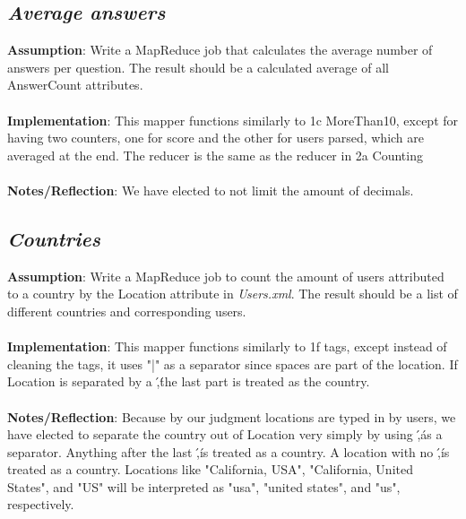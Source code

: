 \documentclass[fleqn,10pt]{wlscirep}
\begin{document}
\subsection{\emph{Average answers}}
\textbf{Assumption}: Write a MapReduce job that calculates the average number of answers per question. The result should be a calculated average of all AnswerCount attributes. \\ \\
\textbf{Implementation}: This mapper functions similarly to 1c MoreThan10, except for having two counters, one for score and the other for users parsed, which are averaged at the end. The reducer is the same as the reducer in 2a Counting \\ \\
\textbf{Notes/Reflection}: We have elected to not limit the amount of decimals.


\subsection{\emph{Countries}}
\textbf{Assumption}: Write a MapReduce job to count the amount of users attributed to a country by the Location attribute in \textit{Users.xml}. The result should be a list of different countries and corresponding users. \\ \\
\textbf{Implementation}: This mapper functions similarly to 1f tags, except instead of cleaning the tags, it uses "|" as a separator since spaces are part of the location. If Location is separated by a \',\' the last part is treated as the country. \\ \\
\textbf{Notes/Reflection}: Because by our judgment locations are typed in by users, we have elected to separate the country out of Location very simply by using \',\' as a separator. Anything after the last \',\' is treated as a country. A location with no \',\' is treated as a country. Locations like "California, USA", "California, United States", and "US" will be interpreted as "usa", "united states", and "us", respectively.

\end{document}
